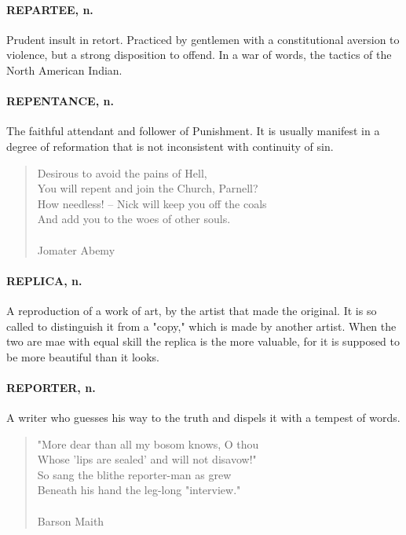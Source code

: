 \documentclass[11pt]{article}
\begin{document}
\paragraph{REPARTEE, n.}  Prudent insult in retort.  Practiced by gentlemen with a
constitutional aversion to violence, but a strong disposition to
offend.  In a war of words, the tactics of the North American Indian.

\paragraph{REPENTANCE, n.}  The faithful attendant and follower of Punishment.  It
is usually manifest in a degree of reformation that is not
inconsistent with continuity of sin.

\begin{quote}   Desirous to avoid the pains of Hell, \\
  You will repent and join the Church, Parnell? \\
  How needless! -- Nick will keep you off the coals \\
  And add you to the woes of other souls. \\
 \\
Jomater Abemy \end{quote}


\paragraph{REPLICA, n.}  A reproduction of a work of art, by the artist that made
the original.  It is so called to distinguish it from a "copy," which
is made by another artist.  When the two are mae with equal skill the
replica is the more valuable, for it is supposed to be more beautiful
than it looks.

\paragraph{REPORTER, n.}  A writer who guesses his way to the truth and dispels it
with a tempest of words.

\begin{quote}   "More dear than all my bosom knows, O thou \\
  Whose 'lips are sealed' and will not disavow!" \\
  So sang the blithe reporter-man as grew \\
  Beneath his hand the leg-long "interview." \\
 \\
Barson Maith \end{quote}
\end{document}
